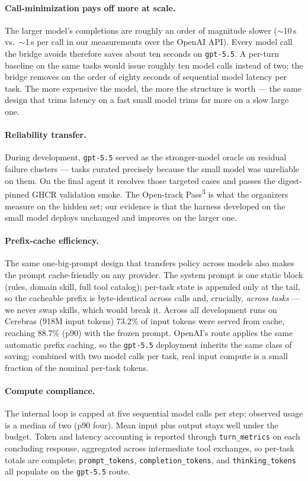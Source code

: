 \documentclass{article}
\begin{document}
\paragraph{Call-minimization pays off more at scale.}
The larger model's completions are roughly an order of magnitude slower
($\sim$10\,s vs.\ $\sim$1\,s per call in our measurements over the OpenAI API).
Every model call the bridge avoids therefore saves about ten seconds on
\texttt{gpt-5.5}. A per-turn baseline on the same tasks would issue roughly ten
model calls instead of two; the bridge removes on the order of eighty seconds of
sequential model latency per task. The more expensive the model, the more the
structure is worth --- the same design that trims latency on a fast small model
trims far more on a slow large one.

\paragraph{Reliability transfer.}
During development, \texttt{gpt-5.5} served as the stronger-model oracle on
residual failure clusters --- tasks curated precisely because the small model was
unreliable on them. On the final agent it resolves those targeted cases and
passes the digest-pinned GHCR validation smoke. The Open-track
Pass\textsuperscript{3} is what the organizers measure on the hidden set; our
evidence is that the harness developed on the small model deploys unchanged and
improves on the larger one.

\paragraph{Prefix-cache efficiency.}
The same one-big-prompt design that transfers policy across models also makes the
prompt cache-friendly on any provider. The system prompt is one static block
(rules, domain skill, full tool catalog); per-task state is appended only at the
tail, so the cacheable prefix is byte-identical across calls and, crucially,
\emph{across tasks} --- we never swap skills, which would break it. Across all
development runs on Cerebras (918M input tokens) 73.2\% of input tokens were
served from cache, reaching 88.7\% (p90) with the frozen prompt. OpenAI's
route applies the same automatic prefix caching, so the \texttt{gpt-5.5}
deployment inherits the same class of saving; combined with two model calls per
task, real input compute is a small fraction of the nominal per-task tokens.

\paragraph{Compute compliance.}
The internal loop is capped at five sequential model calls per step; observed
usage is a median of two (p90 four). Mean input plus output stays well under the
budget. Token and latency accounting is reported through \texttt{turn\_metrics}
on each concluding response, aggregated across intermediate tool exchanges, so
per-task totals are complete; \texttt{prompt\_tokens}, \texttt{completion\_tokens},
and \texttt{thinking\_tokens} all populate on the \texttt{gpt-5.5} route.
\end{document}
